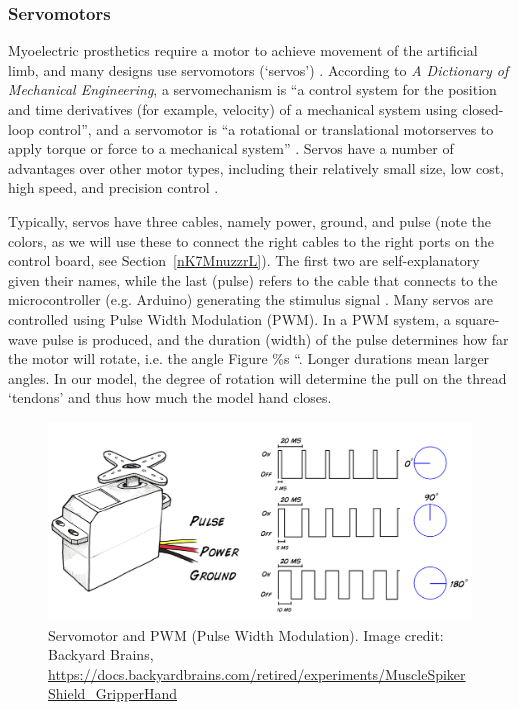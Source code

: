 \documentclass{article}
\begin{document}
\subsubsection{Servomotors}

Myoelectric prosthetics require a motor to achieve movement of the artificial limb, and many designs use servomotors (`servos') \citep{ten20173d}. According to \textit{A Dictionary of Mechanical Engineering}, a servomechanism is ``a control system for the position and time derivatives (for example, velocity) of a mechanical system using closed-loop control'', and a servomotor is ``a rotational or translational motor\dotswhich serves to apply torque or force to a mechanical system'' \citep{escudier2019dictionary}. Servos have a number of advantages over other motor types, including their relatively small size, low cost, high speed, and precision control \citep{bbclaw, ellis2012basics}.

Typically, servos have three cables, namely power, ground, and pulse (note the colors, as we will use these to connect the right cables to the right ports on the control board, see Section~\ref{nK7MnuzzrL}). The first two are self-explanatory given their names, while the last (pulse) refers to the cable that connects to the microcontroller (e.g. Arduino) generating the stimulus signal \citep{bbclaw}. Many servos are controlled using Pulse Width Modulation (PWM). In a PWM system, a square-wave pulse is produced, and the duration (width) of the pulse determines how far the motor will rotate, i.e. the angle \citep{}Figure \%s ``. Longer durations mean larger angles. In our model, the degree of rotation will determine the pull on the thread `tendons' and thus how much the model hand closes.

\begin{figure}[!htbp]
\centering
\includegraphics[width=0.9\linewidth]{files/EPpXta8zJdzN048lz8AR-668fb5e878304ce5b48e2ee40f6cd3a6.png}
\caption[]{Servomotor and PWM (Pulse Width Modulation). Image credit: Backyard Brains, \href{https://docs.backyardbrains.com/retired/experiments/MuscleSpikerShield\_GripperHand}{https://docs.backyardbrains.com/retired/experiments/MuscleSpikerShield\_GripperHand}}
\label{SUpFkoFTj4}
\end{figure}
\end{document}
